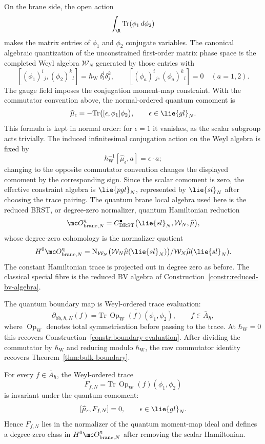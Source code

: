 \documentclass[11pt]{memoir}
\begin{document}
On the brane side, the open action
$$\int_\R\mathrm{Tr}(\phi_1\,d\phi_2)$$
makes the matrix entries of $\phi_1$ and $\phi_2$ conjugate variables.
The canonical algebraic quantization of the unconstrained first-order matrix
phase space is the completed Weyl algebra
$\mathcal W_N$ generated by those entries with
$$[(\phi_1)^i{}_j,(\phi_2)^k{}_l]
  =\hbar_{\mathrm{W}}\,\delta^i_l\delta^k_j,\qquad
  [(\phi_a)^i{}_j,(\phi_a)^k{}_l]=0\quad(a=1,2).$$
The gauge field imposes the conjugation moment-map constraint. With the
commutator convention above, the normal-ordered quantum comoment is
$$\widehat\mu_\epsilon=-\mathrm{Tr}\bigl([\epsilon,\phi_1]\phi_2\bigr),
  \qquad \epsilon\in\lie{gl}_N.$$
This formula is kept in normal order: for $\epsilon=1$ it vanishes, as the
scalar subgroup acts trivially.  The induced infinitesimal conjugation
action on the Weyl algebra is fixed by
$$\hbar_{\mathrm{W}}^{-1}[\widehat\mu_\epsilon,a]=\epsilon\cdot a;$$
changing to the opposite commutator convention changes the displayed
comoment by the corresponding sign.  Since the scalar comoment is zero, the effective
constraint algebra is \(\lie{pgl}_N\), represented by
\(\lie{sl}_N\) after choosing the trace pairing.  The quantum brane
local algebra used here is the reduced BRST, or degree-zero normalizer,
quantum Hamiltonian reduction
$$\mc O^{\mathrm q}_{\mathrm{brane},N}
  =C^\bullet_{\mathrm{BRST}}
    \bigl(\lie{sl}_N,\mathcal W_N,\widehat\mu\bigr),$$
whose degree-zero cohomology is the normalizer quotient
$$H^0\mc O^{\mathrm q}_{\mathrm{brane},N}
  =\mathrm N_{\mathcal W_N}
    \bigl(\mathcal W_N\widehat\mu(\lie{sl}_N)\bigr)/
    \mathcal W_N\widehat\mu(\lie{sl}_N).$$
The constant Hamiltonian trace is projected out in degree zero as before. The
classical special fibre is the reduced BV algebra of
Construction~\ref{constr:reduced-bv-algebra}.

The quantum boundary map is Weyl-ordered trace evaluation:
$$\partial_{\mathrm{bb},\hbar,N}(f)
  =\overline{\mathrm{Tr}\,\operatorname{Op}_{\mathrm W}(f)(\phi_1,\phi_2)},
  \qquad f\in\bar A_\hbar,$$
where $\operatorname{Op}_{\mathrm W}$ denotes total symmetrisation before
passing to the trace. At \(\hbar_{\mathrm{W}}=0\) this recovers
Construction~\ref{constr:boundary-evaluation}. After dividing the commutator by
\(\hbar_{\mathrm{W}}\) and reducing modulo \(\hbar_{\mathrm{W}}\), the raw commutator identity recovers
Theorem~\ref{thm:bulk-boundary}.

\begin{prop}\label{prop:quantum-boundary-descends}
  For every $f\in\bar A_\hbar$, the Weyl-ordered trace
  $$F_{f,N}=\mathrm{Tr}\,\operatorname{Op}_{\mathrm W}(f)(\phi_1,\phi_2)$$
  is invariant under the quantum comoment:
  $$[\widehat\mu_\epsilon,F_{f,N}]=0,\qquad \epsilon\in\lie{gl}_N.$$
  Hence $F_{f,N}$ lies in the normalizer of the quantum moment-map ideal and
  defines a degree-zero class in
  $H^0\mc O^{\mathrm q}_{\mathrm{brane},N}$ after removing the scalar
  Hamiltonian.
\end{prop}
\end{document}
